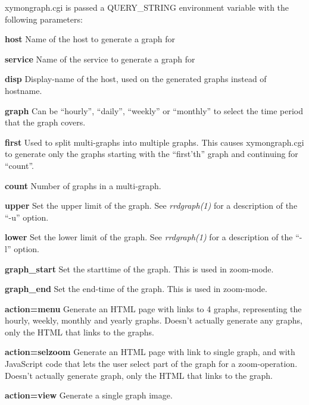   xymongraph.cgi is passed a QUERY\_STRING environment variable with the following parameters: 


 \textbf{host}
 Name of the host to generate a graph for 


 \textbf{service}
 Name of the service to generate a graph for 


 \textbf{disp}
 Display-name of the host, used on the generated graphs instead of hostname. 


 \textbf{graph}
 Can be ``hourly'', ``daily'', ``weekly'' or ``monthly'' to select the time period that the graph covers. 


 \textbf{first}
 Used to split multi-graphs into multiple graphs. This causes
 xymongraph.cgi to generate only the graphs starting with the
 ``first'th'' graph and continuing for ``count''. 


 \textbf{count}
 Number of graphs in a multi-graph. 


 \textbf{upper}
 Set the upper limit of the graph. See \emph{rrdgraph(1)}
 for a description of the ``-u'' option. 


 \textbf{lower}
 Set the lower limit of the graph. See \emph{rrdgraph(1)}
 for a description of the ``-l'' option. 


 \textbf{graph\_start}
 Set the starttime of the graph. This is used in zoom-mode. 


 \textbf{graph\_end}
 Set the end-time of the graph. This is used in zoom-mode. 


 \textbf{action=menu}
 Generate an HTML page with links to 4 graphs, representing the hourly, weekly, monthly and yearly graphs. Doesn't actually generate any graphs, only the HTML that links to the graphs. 


 \textbf{action=selzoom}
 Generate an HTML page with link to single graph, and with JavaScript code that lets the user select part of the graph for a zoom-operation. Doesn't actually generate graph, only the HTML that links to the graph. 


 \textbf{action=view}
 Generate a single graph image. 


 
